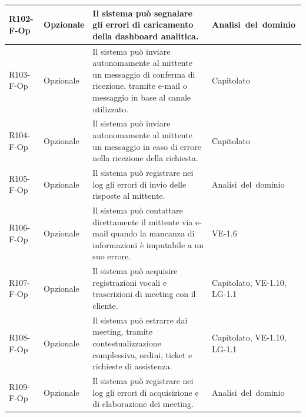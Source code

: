 {\begin{longtable}{|>{\raggedright\arraybackslash}p{1.8cm}|>{\raggedright\arraybackslash}p{2.3cm}|>{\raggedright\arraybackslash}p{6.6cm}|>{\raggedright\arraybackslash}p{3.1cm}|}
    \mbox{R102-F-Op} & Opzionale & Il sistema può segnalare gli errori di caricamento della dashboard analitica. & \mbox{Analisi del dominio} \\ \hline
    \mbox{R103-F-Op} & Opzionale & Il sistema può inviare autonomamente al mittente un messaggio di conferma di ricezione, tramite e-mail o messaggio in base al canale utilizzato. & \mbox{Capitolato} \\ \hline
    \mbox{R104-F-Op} & Opzionale & Il sistema può inviare autonomamente al mittente un messaggio in caso di errore nella ricezione della richiesta. & \mbox{Capitolato} \\ \hline
    \mbox{R105-F-Op} & Opzionale & Il sistema può registrare nei log gli errori di invio delle risposte al mittente. & \mbox{Analisi del dominio} \\ \hline
    \mbox{R106-F-Op} & Opzionale & Il sistema può contattare direttamente il mittente via e-mail quando la mancanza di informazioni è imputabile a un suo errore. & \mbox{VE-1.6} \\ \hline
    \mbox{R107-F-Op} & Opzionale & Il sistema può acquisire registrazioni vocali e trascrizioni di meeting con il cliente. & \mbox{Capitolato}, \mbox{VE-1.10}, \mbox{LG-1.1} \\ \hline
    \mbox{R108-F-Op} & Opzionale & Il sistema può estrarre dai meeting, tramite contestualizzazione complessiva, ordini, ticket e richieste di assistenza. & \mbox{Capitolato}, \mbox{VE-1.10}, \mbox{LG-1.1} \\ \hline
    \mbox{R109-F-Op} & Opzionale & Il sistema può registrare nei log gli errori di acquisizione e di elaborazione dei meeting. & \mbox{Analisi del dominio} \\ \hline
    \end{longtable}
}